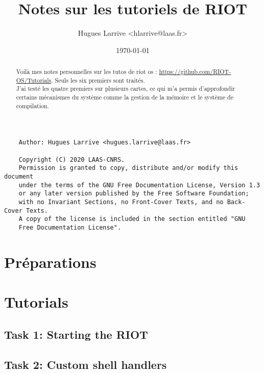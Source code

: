 \documentclass[a4paper,12pt, twoside]{article}
\title{Notes sur les tutoriels de RIOT}
\author{Hugues Larrive <hlarrive@laas.fr>}
\date{\today}	%
\begin{document}
\maketitle{}


\begin{abstract}
    Voilà mes notes personnelles sur les tutos de riot os :
    \url{https://github.com/RIOT-OS/Tutorials}. Seuls les six
    premiers sont traités.\\
    
    J'ai testé les quatre premiers sur plusieurs cartes, ce qui m'a
    permis d'approfondir certains mécanismes du système comme la gestion
    de la mémoire et le système de compilation.
\end{abstract}


{\footnotesize
\begin{verbatim}
    Author: Hugues Larrive <hugues.larrive@laas.fr>
    
	Copyright (C) 2020 LAAS-CNRS.
	Permission is granted to copy, distribute and/or modify this document
	under the terms of the GNU Free Documentation License, Version 1.3
	or any later version published by the Free Software Foundation;
	with no Invariant Sections, no Front-Cover Texts, and no Back-Cover Texts.
	A copy of the license is included in the section entitled "GNU
	Free Documentation License".
\end{verbatim}
}

\newpage

\renewcommand{\contentsname}{Sommaire}
\tableofcontents{}

\section{Préparations}


\section{Tutorials}
\subsection{Task 1: Starting the RIOT}


\subsection{Task 2: Custom shell handlers}

\end{document}
